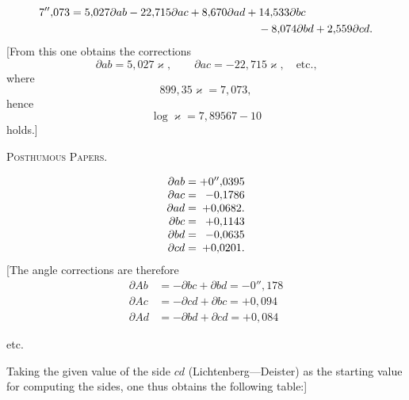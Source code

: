 \[
\begin{aligned}
7''{,}073={}&5{,}027\partial ab-22{,}715\partial ac+8{,}670\partial ad+14{,}533\partial bc\\
&\hspace{5.5cm}-8{,}074\partial bd+2{,}559\partial cd.
\end{aligned}
\]
[From this one obtains the corrections
\[
\partial ab=5{,}027\varkappa,\qquad\partial ac=-22{,}715\varkappa,\quad\text{etc.,}
\]
\noindent where
\[
899{,}35\varkappa=7{,}073,
\]
\noindent hence
\[
\log\varkappa=7{,}89567-10
\]
\noindent holds.]

\clearpage
{}\hfill\textsc{Posthumous Papers.}\hfill\mbox{}\par\medskip
\[
\begin{array}{r@{\;}c@{\;}r}
\partial ab&=&+0''{,}0395\\
\partial ac&=&-0{,}1786\\
\partial ad&=&+0{,}0682.\\
\partial bc&=&+0{,}1143\\
\partial bd&=&-0{,}0635\\
\partial cd&=&+0{,}0201.
\end{array}
\]
[The angle corrections are therefore
\[
\begin{aligned}
\partial Ab&=-\partial bc+\partial bd=-0''{,}178\\
\partial Ac&=-\partial cd+\partial bc=+0{,}094\\
\partial Ad&=-\partial bd+\partial cd=+0{,}084
\end{aligned}
\]
\begin{center}etc.\end{center}
Taking the given value of the side $cd$ (Lichtenberg---Deister) as the starting value for computing the sides, one thus obtains the following table:]
